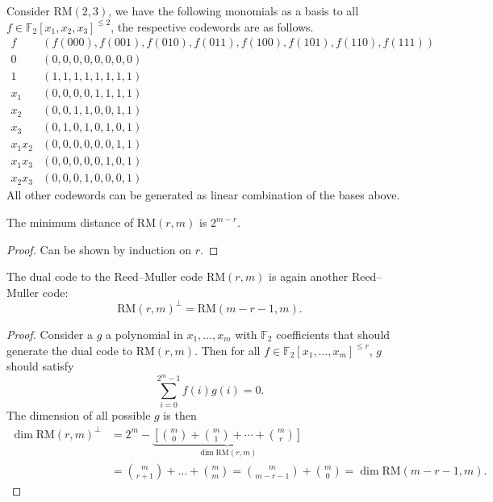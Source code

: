 \begin{example}
    Consider $\mathrm{RM}(2,3)$, we have the following monomials as a basis to all $f\in\mathbb{F}_2[x_1,x_2,x_3]^{\le2}$, the respective codewords are as follows.
    \begin{equation*}
    \begin{array}{c|c}
        f & \left(f(000),f(001),f(010),f(011),f(100),f(101),f(110),f(111)\right) \\ \hline
        0 & (0,0,0,0,0,0,0,0) \\
        1 & (1,1,1,1,1,1,1,1) \\
        x_1 & (0,0,0,0,1,1,1,1) \\
        x_2 & (0,0,1,1,0,0,1,1) \\
        x_3 & (0,1,0,1,0,1,0,1) \\
        x_1x_2 & (0,0,0,0,0,0,1,1) \\
        x_1x_3 & (0,0,0,0,0,1,0,1) \\
        x_2x_3 & (0,0,0,1,0,0,0,1)
    \end{array}
    \end{equation*}
    All other codewords can be generated as linear combination of the bases above.
\end{example}
\begin{theorem}
    The minimum distance of $\mathrm{RM}(r,m)$ is $2^{m-r}$.
\end{theorem}
\begin{proof}
    Can be shown by induction on $r$.
\end{proof}

\begin{theorem}[Dual of RM]
    The dual code to the Reed--Muller code $\mathrm{RM}(r,m)$ is again another Reed--Muller code:
    \begin{equation}
        \mathrm{RM}(r,m)^\perp = \mathrm{RM}(m-r-1,m).
    \end{equation}
\end{theorem}
\begin{proof}
    Consider a $g$ a polynomial in $x_1,\ldots,x_m$ with $\mathbb{F}_2$ coefficients that should generate the dual code to $\mathrm{RM}(r,m)$. Then for all $f\in\mathbb{F}_2[x_1,\ldots,x_m]^{\le r}$, $g$ should satisfy
    \begin{equation*}
        \sum_{i=0}^{2^m-1} f(i) g(i) = 0.
    \end{equation*}
    The dimension of all possible $g$ is then
    \begin{align*}
        \dim\mathrm{RM}(r,m)^\perp &= 2^m - \underbrace{\left[\binom{m}{0} + \binom{m}{1} + \cdots + \binom{m}{r}\right]}_{\dim\mathrm{RM}(r,m)} \\
        &= \binom{m}{r+1} + \ldots + \binom{m}{m} = \binom{m}{m-r-1} + \binom{m}{0} = \dim\mathrm{RM}(m-r-1,m).
    \end{align*}
\end{proof}

